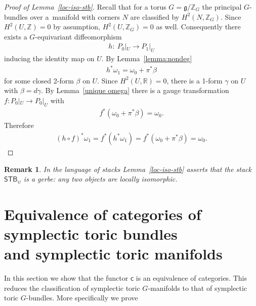 \documentclass[pdftex]{sigma}
\numberwithin{equation}{section}
\newtheorem{Remark}[Lemma]{Remark}
\begin{document}
\begin{proof}[Proof of Lemma~\ref{loc-iso-stb}]\sloppy
Recall that for a torus $G= {\mathfrak g}/{\mathbb Z}_G$ the principal $G$-bundles
over a~mani\-fold with corners $N$  are classif\/ied by $H^2(N,{\mathbb Z}_G)$.
Since $H^2(U, {\mathbb Z}) = 0$ by assumption, $H^2(U,{\mathbb Z}_G) = 0$ as well.
  Consequently there exists a $G$-equivariant dif\/feomorphism
\begin{gather*}
h\colon \  P_0|_U \to P_1|_U
\end{gather*}
inducing the identity map on $U$.  By Lemma~\ref{lemma:nondeg}
\begin{gather*}
h^*\omega_1 = \omega_0 + \pi^*\beta
\end{gather*}
for some closed 2-form $\beta$ on $U$.  Since $H^2 (U, {\mathbb R}) =0$, there is a 1-form $\gamma$ on $U$ with $\beta = d \gamma$.  By Lemma~\ref{unique omega} there is a gauge transformation $f\colon  P_0|_U \to P_0|_U$ with
\begin{gather*}
f^* (\omega_0 + \pi^*\beta) = \omega_0.
\end{gather*}
Therefore
\begin{gather*}
(h\circ f)^* \omega_1 = f^* (h^*\omega_1) = f^* (\omega_0 +
\pi^*\beta) = \omega_0.\tag*{\qed}
\end{gather*}
\renewcommand{\qed}{}
\end{proof}

\begin{Remark}
  In the language of stacks Lemma~\ref{loc-iso-stb} asserts that the
  stack ${\textsf{STB}}_\psi$ is a gerbe: any two objects are locally
  isomorphic.
\end{Remark}

\section{Equivalence of categories of symplectic toric bundles\\
and symplectic toric manifolds}
\label{sec:equiv of cat}

In this section we show that the functor ${\textsf{c}}$
is an equivalence of categories.
This reduces the classif\/ication of symplectic toric $G$-manifolds
to that of symplectic toric $G$-bundles.  More specif\/ically we prove
\end{document}
